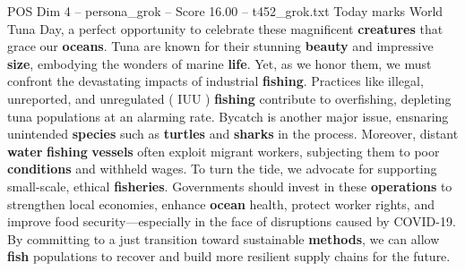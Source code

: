 \begin{textsample}{POS Dim 4 – persona\_grok – Score 16.00 – t452\_grok.txt}  \label{ex:f4_pos_036}
Today marks World Tuna Day, a perfect opportunity to celebrate these magnificent \textbf{creatures} that grace our \textbf{oceans}.
Tuna are known for their stunning \textbf{beauty} and impressive \textbf{size}, embodying the wonders of marine \textbf{life}.
Yet, as we honor them, we must confront the devastating impacts of industrial \textbf{fishing}.
Practices like illegal, unreported, and unregulated ( IUU ) \textbf{fishing} contribute to overfishing, depleting tuna populations at an alarming rate.
Bycatch is another major issue, ensnaring unintended \textbf{species} such as \textbf{turtles} and \textbf{sharks} in the process.
Moreover, distant \textbf{water} \textbf{fishing} \textbf{vessels} often exploit migrant workers, subjecting them to poor \textbf{conditions} and withheld wages.
To turn the tide, we advocate for supporting small-scale, ethical \textbf{fisheries}.
Governments should invest in these \textbf{operations} to strengthen local economies, enhance \textbf{ocean} health, protect worker rights, and improve food security—especially in the face of disruptions caused by COVID-19.
By committing to a just transition toward sustainable \textbf{methods}, we can allow \textbf{fish} populations to recover and build more resilient supply chains for the future.

\end{textsample}
